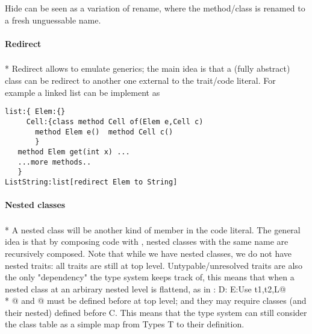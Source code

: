 Hide can be seen as a variation of rename, where the method/class is renamed to a fresh unguessable name.

\paragraph{Redirect}${}_{}$\\*
Redirect allows to emulate generics; the main idea is that a (fully abstract) class can be redirect to another one external to the trait/code literal.
For example a linked list can be implement as
\begin{lstlisting}
list:{ Elem:{}
     Cell:{class method Cell of(Elem e,Cell c) 
       method Elem e()  method Cell c()
       }
   method Elem get(int x) ...
   ...more methods..
   }
ListString:list[redirect Elem to String]
\end{lstlisting}





\paragraph{Nested classes}${}_{}$\\*
A nested class will be another kind of member in the code literal.
The general idea is that by composing code with \use, nested classes with the same name are recursively composed.
Note that while we have nested classes, we do not have nested traits: all traits are still
at top level.
Untypable/unresolved traits are also the only "dependency"
the type system keeps track of, this means that when a nested class at an arbirary
nested level is flattend, as in
\Q@C:{ D:{ E:Use t1,t2,L}}@\\*
@ and @ must be defined before \Q@C@ at top level; and they may require classes (and their
nested) defined before C. This means that the type system can still consider
the class table as a simple map from Types T to their definition.

